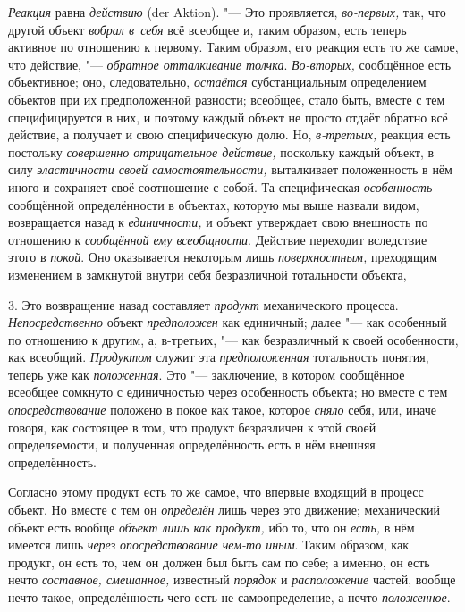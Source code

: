 {\em Реакция} равна
{\em действию} (der Aktion). "---
Это проявляется,
{\em во-первых,}
так, что другой объект
{\em вобрал в~себя} всё
всеобщее и, таким образом, есть теперь активное по отношению к первому.
Таким образом, его реакция есть то же самое, что действие, "---
{\em обратное отталкивание толчка}.
{\em Во-вторых,}
сообщённое есть объективное; оно, следовательно,
{\em остаётся}
субстанциальным определением объектов при их предположенной
разности; всеобщее, стало быть, вместе с тем специфицируется в них, и
поэтому каждый объект не просто отдаёт обратно всё действие, а получает и
свою специфическую долю. Но,
{\em в-третьих,} реакция
есть постольку {\em совершенно
отрицательное действие,} поскольку каждый объект, в силу
{\em эластичности своей
самостоятельности,} выталкивает положенность в нём иного и
сохраняет своё соотношение с собой. Та специфическая
{\em особенность}
сообщённой определённости в объектах, которую мы выше назвали
видом, возвращается назад к
{\em единичности,} и
объект утверждает свою внешность по отношению к
{\em сообщённой ему всеобщности}.
Действие переходит вследствие этого в
{\em покой}. Оно
оказывается некоторым лишь
{\em поверхностным,}
преходящим изменением в замкнутой внутри себя безразличной
тотальности объекта,

3. Это возвращение назад составляет
{\em продукт}
механического процесса. {\em Непосредственно} объект {\em предположен}
как единичный; далее "--- как особенный по отношению к другим, а,
в-третьих, "--- как безразличный к своей особенности, как всеобщий.
{\em Продуктом} служит эта {\em предположенная} тотальность понятия,
теперь уже как {\em положенная}. Это "--- заключение,
в котором сообщённое всеобщее сомкнуто с единичностью через
особенность объекта; но вместе с тем {\em опосредствование}
положено в покое как такое, которое {\em сняло} себя, или,
иначе говоря, как состоящее в том, что продукт безразличен к этой своей
определяемости, и полученная определённость есть в нём внешняя определённость.

Согласно этому продукт есть то же самое, что впервые входящий
в процесс объект. Но вместе с тем он {\em определён} лишь
через это движение; механический объект есть вообще
{\em объект лишь как продукт,} ибо то, что он {\em есть,} в нём имеется
лишь {\em через опосредствование
чем-то иным}. Таким образом, как продукт, он есть то,
чем он должен был быть сам по себе; а именно, он есть нечто
{\em составное, смешанное,} известный {\em порядок} и {\em расположение}
частей, вообще нечто такое, определённость чего есть не
самоопределение, а нечто {\em положенное}.

